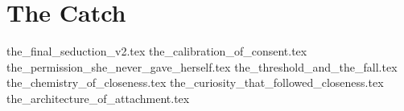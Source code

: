 
\section{The Catch}

{the_final_seduction_v2.tex}
{the_calibration_of_consent.tex}
{the_permission_she_never_gave_herself.tex}
{the_threshold_and_the_fall.tex}
{the_chemistry_of_closeness.tex}
{the_curiosity_that_followed_closeness.tex}
{the_architecture_of_attachment.tex}